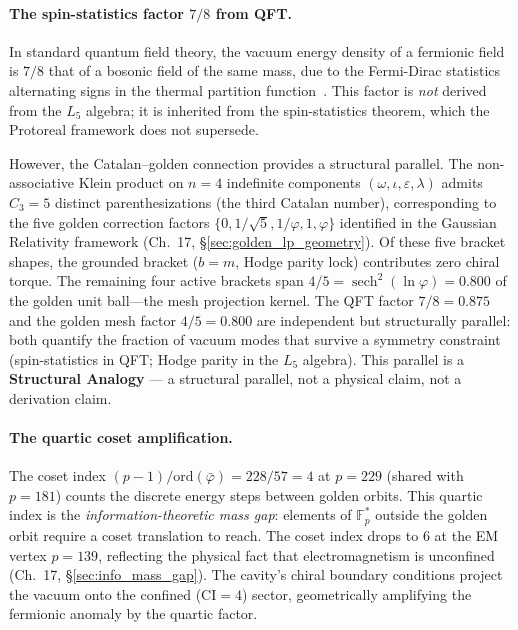 \paragraph{The spin-statistics factor $7/8$ from QFT.}
In standard quantum field theory, the vacuum energy density of a fermionic field is $7/8$ that of a bosonic field of the same mass, due to the Fermi-Dirac statistics alternating signs in the thermal partition function~\cite{weinberg_qft}. This factor is \emph{not} derived from the $L_5$ algebra; it is inherited from the spin-statistics theorem, which the Protoreal framework does not supersede.

However, the Catalan--golden connection provides a structural parallel. The non-associative Klein product on $n = 4$ indefinite components $(\omega, \iota, \varepsilon, \lambda)$ admits $C_3 = 5$ distinct parenthesizations (the third Catalan number), corresponding to the five golden correction factors $\{0, 1/\sqrt{5}, 1/\varphi, 1, \varphi\}$ identified in the Gaussian Relativity framework (Ch.~17, \S\ref{sec:golden_lp_geometry}). Of these five bracket shapes, the grounded bracket ($b = m$, Hodge parity lock) contributes zero chiral torque. The remaining four active brackets span $4/5 = \operatorname{sech}^2(\ln\varphi) = 0.800$ of the golden unit ball---the mesh projection kernel. The QFT factor $7/8 = 0.875$ and the golden mesh factor $4/5 = 0.800$ are independent but structurally parallel: both quantify the fraction of vacuum modes that survive a symmetry constraint (spin-statistics in QFT; Hodge parity in the $L_5$ algebra). This parallel is a \textbf{Structural Analogy} --- a structural parallel, not a physical claim, not a derivation claim.

\paragraph{The quartic coset amplification.}
The coset index $(p-1)/\mathrm{ord}(\bar\varphi) = 228/57 = 4$ at $p = 229$ (shared with $p = 181$) counts the discrete energy steps between golden orbits. This quartic index is the \emph{information-theoretic mass gap}: elements of $\mathbb{F}_p^*$ outside the golden orbit require a coset translation to reach. The coset index drops to $6$ at the EM vertex $p = 139$, reflecting the physical fact that electromagnetism is unconfined (Ch.~17, \S\ref{sec:info_mass_gap}). The cavity's chiral boundary conditions project the vacuum onto the confined ($\mathrm{CI} = 4$) sector, geometrically amplifying the fermionic anomaly by the quartic factor.

